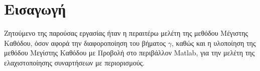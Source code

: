 \chapter{Εισαγωγή}
\label{ch:introduction}

Ζητούμενο της παρούσας εργασίας ήταν η περαιτέρω μελέτη της μεθόδου Μέγιστης Καθόδου, όσον αφορά την διαφοροποίηση του βήματος $\gamma$, καθώς και η υλοποίηση της μεθόδου Μεγίστης Καθόδου με Προβολή στο περιβάλλον Matlab, για την μελέτη της ελαχιστοποίησης συναρτήσεων με περιορισμούς.